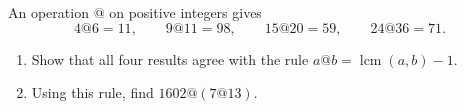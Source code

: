 An operation $@$ on positive integers gives
\[4@6=11,\qquad 9@11=98,\qquad 15@20=59,\qquad 24@36=71 .\]
\begin{enumerate}
\item[(a)] Show that all four results agree with the rule $a@b=\operatorname{lcm}(a,b)-1$.
\item[(b)] Using this rule, find $1602@(7@13)$.
\end{enumerate}

